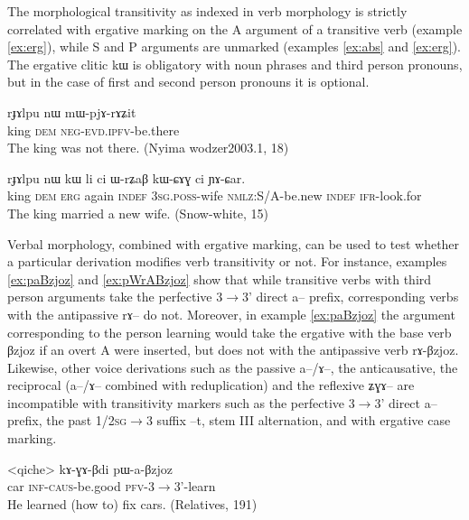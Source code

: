 \documentclass[oldfontcommands,oneside,a4paper,11pt]{article}
\newcommand{\ipa}[1]{{\phon \mbox{#1}}} %
\begin{document}
The morphological transitivity as indexed in verb morphology is strictly correlated with ergative marking on the A argument of a transitive verb (example \ref{ex:erg}), while S and P arguments are unmarked (examples \ref{ex:abs} and \ref{ex:erg}). The ergative clitic \ipa{kɯ} is obligatory with noun phrases and third person pronouns, but in the case of first and second person pronouns it is optional.  

 \begin{exe}
\ex \label{ex:abs}
\gll
\ipa{rɟɤlpu}  	\ipa{nɯ}  	\ipa{mɯ-pjɤ-rɤʑit}  \\
king \textsc{dem} \textsc{neg-evd.ipfv}-be.there \\
 \glt The king was not there. (Nyima wodzer2003.1, 18)
\end{exe}

 \begin{exe}
\ex \label{ex:erg}
\gll 
\ipa{rɟɤlpu}  	\ipa{nɯ}  	\ipa{kɯ}  	\ipa{li}  	\ipa{ci}  	\ipa{ɯ-rʑaβ}  	\ipa{kɯ-ɕɤɣ}  	\ipa{ci}  	\ipa{ɲɤ-ɕar.}  	 \\
king \textsc{dem} \textsc{erg} again \textsc{indef} \textsc{3sg.poss}-wife \textsc{nmlz}:S/A-be.new \textsc{indef}  \textsc{ifr}-look.for \\
\glt The king married a new wife. (Snow-white, 15)
\end{exe}

Verbal morphology, combined with ergative marking, can be used to test whether a particular derivation modifies verb transitivity or not. For instance, examples \ref{ex:paBzjoz} and \ref{ex:pWrABzjoz} show that while transitive verbs with third person arguments take the perfective $3\rightarrow$3' direct \ipa{a--} prefix,  corresponding verbs with the antipassive \ipa{rɤ--} do not. Moreover, in example \ref{ex:paBzjoz} the argument corresponding to the person learning would take the ergative with the base verb \ipa{βzjoz} if an overt A were inserted, but does not with the antipassive verb \ipa{rɤ-βzjoz}. Likewise, other voice derivations such as the passive \ipa{a--/ɤ--}, the anticausative, the reciprocal (\ipa{a--/ɤ--} combined with reduplication) and the reflexive \ipa{ʑɣɤ--}  are incompatible with transitivity markers such as the perfective $3\rightarrow$3' direct \ipa{a--} prefix, the past \textsc{1/2sg}$\rightarrow$3 suffix \ipa{--t}, stem III alternation, and with ergative case marking.

 \begin{exe}
\ex \label{ex:paBzjoz}
\gll 
<qiche> 	\ipa{kɤ-ɣɤ-βdi} 	\ipa{pɯ-a-βzjoz} \\
car \textsc{inf-caus}-be.good \textsc{pfv}-3$\rightarrow$3'-learn \\
\glt He learned (how to) fix cars. (Relatives, 191)
\end{exe}
\end{document}
